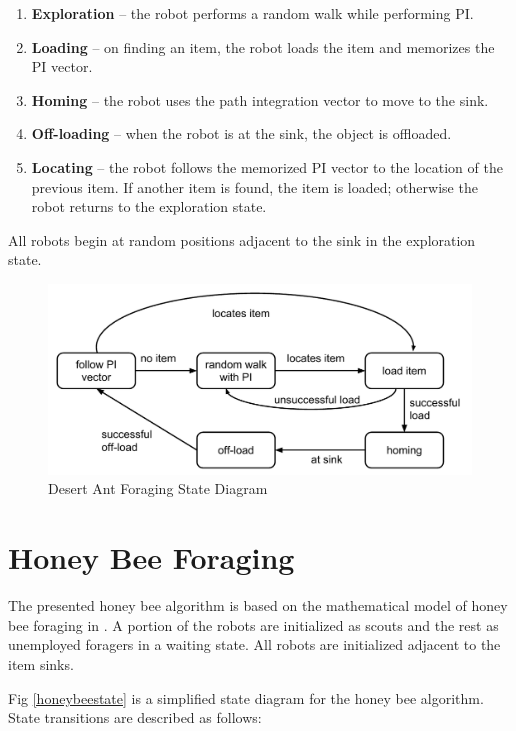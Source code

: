 \begin{enumerate}
	\item\textbf{Exploration} -- the robot performs a random walk while performing PI.
	\item\textbf{Loading} -- on finding an item, the robot loads the item and memorizes the PI vector.
	\item\textbf{Homing } -- the robot uses the path integration vector to move to the sink.
	\item\textbf{Off-loading} -- when the robot is at the sink, the object is offloaded.
	\item\textbf{Locating} -- the robot follows the memorized PI vector to the location of the previous item. If another item is found, the item is loaded; otherwise the robot returns to the exploration state. 
\end{enumerate}
All robots begin at random positions adjacent to the sink in the exploration state.

\begin{figure}[h]
	\centering
	\includegraphics[width=\textwidth]{chapters/chapter3/figures/DesertAntState.pdf}
	\caption{Desert Ant Foraging State Diagram}
	\label{fig:desertantstate}
\end{figure}
	

\section{Honey Bee Foraging}
\label{honeybeeforaging}
The presented honey bee algorithm is based on the mathematical model of honey bee foraging in \cite{seeley2009wisdom}. A portion of the robots are initialized as scouts and the rest  as unemployed foragers in a waiting state. All robots are initialized adjacent to the item sinks.

Fig \ref{honeybeestate} is a simplified state diagram for the honey bee algorithm. State transitions are described as follows: 

